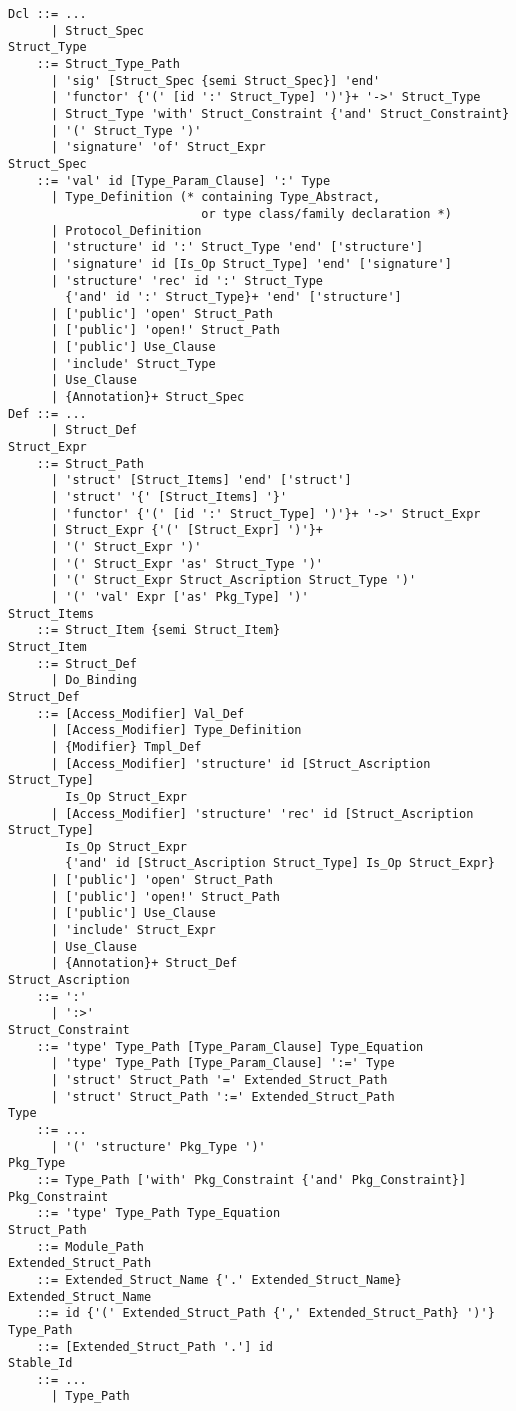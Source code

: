 \grammar\begin{lstlisting}
Dcl ::= ...
      | Struct_Spec
Struct_Type 
    ::= Struct_Type_Path
      | 'sig' [Struct_Spec {semi Struct_Spec}] 'end'
      | 'functor' {'(' [id ':' Struct_Type] ')'}+ '->' Struct_Type
      | Struct_Type 'with' Struct_Constraint {'and' Struct_Constraint}
      | '(' Struct_Type ')'
      | 'signature' 'of' Struct_Expr
Struct_Spec 
    ::= 'val' id [Type_Param_Clause] ':' Type
      | Type_Definition (* containing Type_Abstract, 
                           or type class/family declaration *)
      | Protocol_Definition
      | 'structure' id ':' Struct_Type 'end' ['structure']
      | 'signature' id [Is_Op Struct_Type] 'end' ['signature']
      | 'structure' 'rec' id ':' Struct_Type 
        {'and' id ':' Struct_Type}+ 'end' ['structure']
      | ['public'] 'open' Struct_Path
      | ['public'] 'open!' Struct_Path
      | ['public'] Use_Clause
      | 'include' Struct_Type
      | Use_Clause
      | {Annotation}+ Struct_Spec
Def ::= ...
      | Struct_Def
Struct_Expr 
    ::= Struct_Path
      | 'struct' [Struct_Items] 'end' ['struct']
      | 'struct' '{' [Struct_Items] '}'
      | 'functor' {'(' [id ':' Struct_Type] ')'}+ '->' Struct_Expr
      | Struct_Expr {'(' [Struct_Expr] ')'}+
      | '(' Struct_Expr ')'
      | '(' Struct_Expr 'as' Struct_Type ')'
      | '(' Struct_Expr Struct_Ascription Struct_Type ')'
      | '(' 'val' Expr ['as' Pkg_Type] ')'
Struct_Items 
    ::= Struct_Item {semi Struct_Item} 
Struct_Item 
    ::= Struct_Def 
      | Do_Binding
Struct_Def 
    ::= [Access_Modifier] Val_Def
      | [Access_Modifier] Type_Definition
      | {Modifier} Tmpl_Def
      | [Access_Modifier] 'structure' id [Struct_Ascription Struct_Type] 
        Is_Op Struct_Expr
      | [Access_Modifier] 'structure' 'rec' id [Struct_Ascription Struct_Type] 
        Is_Op Struct_Expr 
        {'and' id [Struct_Ascription Struct_Type] Is_Op Struct_Expr}
      | ['public'] 'open' Struct_Path
      | ['public'] 'open!' Struct_Path
      | ['public'] Use_Clause
      | 'include' Struct_Expr
      | Use_Clause
      | {Annotation}+ Struct_Def
Struct_Ascription 
    ::= ':' 
      | ':>'
Struct_Constraint 
    ::= 'type' Type_Path [Type_Param_Clause] Type_Equation
      | 'type' Type_Path [Type_Param_Clause] ':=' Type
      | 'struct' Struct_Path '=' Extended_Struct_Path
      | 'struct' Struct_Path ':=' Extended_Struct_Path
Type 
    ::= ...
      | '(' 'structure' Pkg_Type ')'
Pkg_Type 
    ::= Type_Path ['with' Pkg_Constraint {'and' Pkg_Constraint}]
Pkg_Constraint
    ::= 'type' Type_Path Type_Equation 
Struct_Path
    ::= Module_Path
Extended_Struct_Path 
    ::= Extended_Struct_Name {'.' Extended_Struct_Name}
Extended_Struct_Name 
    ::= id {'(' Extended_Struct_Path {',' Extended_Struct_Path} ')'}
Type_Path 
    ::= [Extended_Struct_Path '.'] id
Stable_Id
    ::= ...
      | Type_Path
\end{lstlisting}






